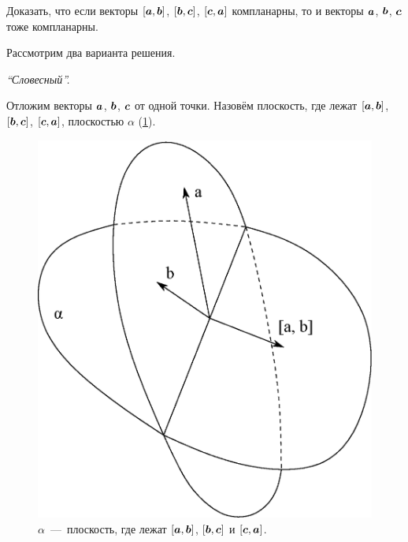 \documentclass[a4paper,12pt]{article}
\begin{document}
  
  \begin{problem}[3.28(1)]
    Доказать, что если векторы $[\boldsymbol a, \boldsymbol b]$, $[\boldsymbol b, \boldsymbol c]$, $[\boldsymbol c, \boldsymbol a]$ компланарны, то и векторы $\boldsymbol a$, $\boldsymbol b$, $\boldsymbol c$ тоже компланарны.
  \end{problem}
  
  \begin{solution}
    Рассмотрим два варианта решения.
    
    \bigskip
    
    \emph{``Словесный''.}
    
    Отложим векторы $\boldsymbol a$, $\boldsymbol b$, $\boldsymbol c$ от одной точки.
    Назовём плоскость, где лежат $[\boldsymbol a, \boldsymbol b]$, $[\boldsymbol b, \boldsymbol c]$, $[\boldsymbol c, \boldsymbol a]$, плоскостью $\alpha$ (\ref{fig:awkward-atom-or-a-pair-of-eggs}).
        
    \begin{figure}[h]
      \centering
      
      \includegraphics[width=0.5\columnwidth]{awkward-atom-or-a-pair-of-eggs}
      
      \caption{$\alpha$~---~плоскость, где лежат $[\boldsymbol a, \boldsymbol b]$, $[\boldsymbol b, \boldsymbol c]$ и $[\boldsymbol c, \boldsymbol a]$.}
      \label{fig:awkward-atom-or-a-pair-of-eggs}
    \end{figure}
    

\end{solution}
\end{document}
